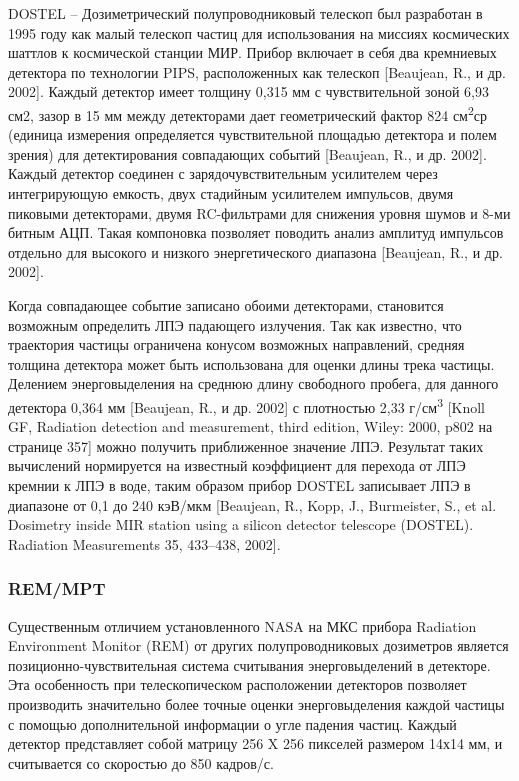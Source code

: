 DOSTEL -- Дозиметрический полупроводниковый телескоп был разработан в 1995 году как малый телескоп частиц для использования на миссиях космических шаттлов к космической станции МИР. Прибор включает в себя два кремниевых детектора по технологии PIPS, расположенных как телескоп [Beaujean, R., и др. 2002]. Каждый детектор имеет толщину 0,315 мм с чувствительной зоной 6,93 см2, зазор в 15 мм между детекторами дает геометрический фактор 824 см\textsuperscript{2}ср (единица измерения определяется чувствительной площадью детектора и полем зрения) для детектирования совпадающих событий [Beaujean, R., и др. 2002]. Каждый детектор соединен с зарядочувствительным усилителем через интегрирующую емкость, двух стадийным усилителем импульсов, двумя пиковыми детекторами, двумя RC-фильтрами для снижения уровня шумов и 8-ми битным АЦП. Такая компоновка позволяет поводить анализ амплитуд импульсов отдельно для высокого и низкого энергетического диапазона [Beaujean, R., и др. 2002].


Когда совпадающее событие записано обоими детекторами, становится возможным определить ЛПЭ падающего излучения. Так как известно, что траектория частицы ограничена конусом возможных направлений, средняя толщина детектора может быть использована для оценки длины трека частицы. Делением энерговыделения на среднюю длину свободного пробега, для данного детектора 0,364 мм [Beaujean, R., и др. 2002] с плотностью 2,33 г/см\textsuperscript{3} [Knoll GF, Radiation detection and measurement, third edition, Wiley: 2000, p802  на странице 357]  можно получить приближенное значение ЛПЭ. Результат таких вычислений нормируется на известный коэффициент для перехода от ЛПЭ кремнии к ЛПЭ в воде, таким образом прибор DOSTEL записывает ЛПЭ в диапазоне от 0,1 до 240 кэВ/мкм [Beaujean, R., Kopp, J., Burmeister, S., et al. Dosimetry inside MIR station using a silicon detector telescope (DOSTEL). Radiation Measurements 35, 433--438, 2002].


\subsubsection{REM/MPT}

Существенным отличием установленного NASA на МКС прибора Radiation Environment Monitor (REM) от других полупроводниковых дозиметров  является позиционно-чувствительная система считывания энерговыделений в детекторе. Эта особенность при телескопическом расположении детекторов позволяет производить значительно более точные оценки энерговыделения каждой частицы с помощью дополнительной информации о угле падения частиц. Каждый детектор представляет собой матрицу 256 X 256 пикселей размером 14х14 мм, и считывается со скоростью до 850 кадров/с.

